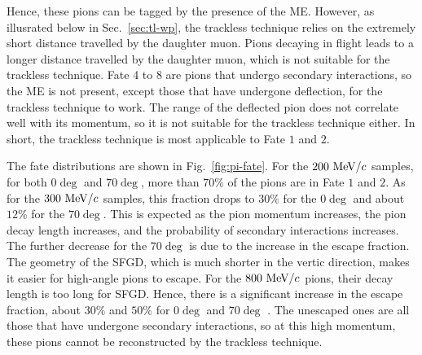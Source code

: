           Hence, these pions can be tagged by the presence of the ME.
          However, as illusrated below in Sec.~\ref{sec:tl-wp}, the trackless technique relies on the extremely short distance travelled by the daughter muon.
          Pions decaying in flight leads to a longer distance travelled by the daughter muon, which is not suitable for the trackless technique.
          Fate 4 to 8 are pions that undergo secondary interactions, so the ME is not present, except those that have undergone deflection, for the trackless technique to work.
          The range of the deflected pion does not correlate well with its momentum, so it is not suitable for the trackless technique either. 
          In short, the trackless technique is most applicable to Fate $1$ and $2$.

          The fate distributions are shown in Fig.~\ref{fig:pi-fate}.
          For the $200~\textrm{MeV}/c$ samples, for both $0\deg$ and $70\deg$, more than $70\%$ of the pions are in Fate $1$ and $2$.
          As for the $300~\textrm{MeV}/c$ samples, this fraction drops to $30\%$ for the $0\deg$ and about $12\%$ for the $70\deg$.
          This is expected as the pion momentum increases, the pion decay length increases, and the probability of secondary interactions increases.
          The further decrease for the $70\deg$ is due to the increase in the escape fraction.
          The geometry of the SFGD, which is much shorter in the vertic direction, makes it easier for high-angle pions to escape.
          For the $800~\textrm{MeV}/c$ pions, their decay length is too long for SFGD.
          Hence, there is a significant increase in the escape fraction, about $30\%$ and $50\%$ for $0\deg$ and $70\deg$ .
          The unescaped ones are all those that have undergone secondary interactions, so at this high momentum, these pions cannot be reconstructed by the trackless technique.
